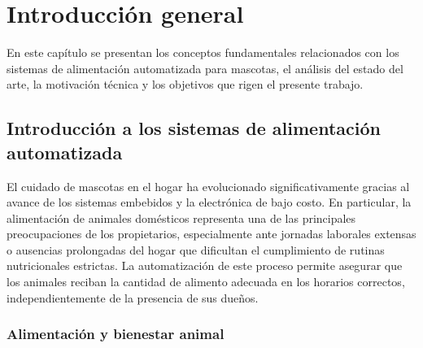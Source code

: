 
\chapter{Introducción general} %

\label{Chapter1} %
\label{IntroGeneral}

En este capítulo se presentan los conceptos fundamentales relacionados con los sistemas de alimentación automatizada para mascotas, el análisis del estado del arte, la motivación técnica y los objetivos que rigen el presente trabajo.


\newcommand{\keyword}[1]{\textbf{#1}}
\newcommand{\tabhead}[1]{\textbf{#1}}
\newcommand{\code}[1]{\texttt{#1}}
\newcommand{\file}[1]{\texttt{\bfseries#1}}
\newcommand{\option}[1]{\texttt{\itshape#1}}
\newcommand{\grados}{$^{\circ}$}



\section{Introducción a los sistemas de alimentación automatizada}

El cuidado de mascotas en el hogar ha evolucionado significativamente gracias al avance de los sistemas embebidos y la electrónica de bajo costo. En particular, la alimentación de animales domésticos representa una de las principales preocupaciones de los propietarios, especialmente ante jornadas laborales extensas o ausencias prolongadas del hogar que dificultan el cumplimiento de rutinas nutricionales estrictas. La automatización de este proceso permite asegurar que los animales reciban la cantidad de alimento adecuada en los horarios correctos, independientemente de la presencia de sus dueños.

\subsection{Alimentación y bienestar animal}

